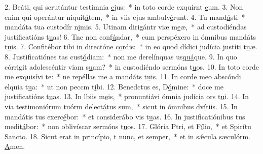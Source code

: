 2. Beáti, qui scrutántur testimnia \uline{e}jus:~* in toto corde exquírnt \uline{e}um.
3. Non enim qui operántur niquit\uline{á}tem,~* in viis ejus ambulv\uline{é}runt.
4. Tu mand\uline{á}sti~* mandáta tua custodír n\uline{i}mis.
5. Utinam dirigántr viæ m\uline{e}æ,~* ad custodiéndas justificatións t\uline{u}as!
6. Tnc non conf\uline{ú}ndar,~* cum perspéxero in ómnibus mandáts t\uline{u}is.
7. Confitébor tibi in directóne c\uline{o}rdis:~* in eo quod dídici judícia justíti t\uline{u}æ.
8. Justificatiónes tas cust\uline{ó}diam:~* non me derelínquas us\uline{quá}que.
9. In quo córrigit adolescéntir viam s\uline{u}am?~* in custodiéndo sermóns t\uline{u}os.
10. In toto corde me exquis\uline{í}vi te:~* ne repéllas me a mandáts t\uline{u}is.
11. In corde meo abscóndi elquia t\uline{u}a:~* ut non peccm t\uline{i}bi.
12. Benedctus es, D\uline{ó}mine:~* doce me justificatións t\uline{u}as.
13. In lbiis m\uline{e}is,~* pronuntiávi ómnia judícia ors t\uline{u}i.
14. In via testimoniórum tuórm delect\uline{á}tus sum,~* sicut in ómnibus dv\uline{í}tiis.
15. In mandátis tus exerc\uline{é}bor:~* et considerábo vis t\uline{u}as.
16. In justificatiónibus tus medit\uline{á}bor:~* non oblivíscar sermóns t\uline{u}os.
17. Glória Ptri, et F\uline{í}lio,~* et Spirítu S\uline{a}ncto.
18. Sicut erat in princípio, t nunc, et s\uline{e}mper,~* et in sǽcula sæculórm. \uline{A}men.
